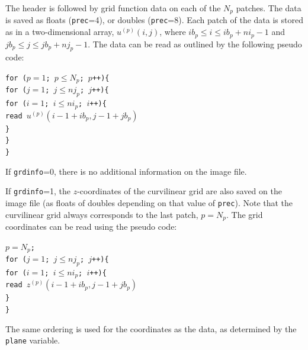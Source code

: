 \documentclass[11pt]{report}
\begin{document}
The header is followed by grid function data on each of the $N_p$ patches. The data is saved as
floats ({\tt prec}=4), or doubles ({\tt prec}=8). Each patch of the data is stored as in a
two-dimensional array, $u^{(p)}(i,j)$, where $ib_p\leq i \leq ib_p+ni_p-1$ and $jb_p\leq j \leq
jb_p+nj_p-1$. The data can be read as outlined by the following pseudo code:
\begin{flushleft}
{\tt for ($p=1$; $p\leq N_p$; $p$++)\{\\
\hspace{5mm}for ($j=1$; $j\leq nj_p$; $j$++)\{\\
\hspace{10mm}for ($i=1$; $i\leq ni_p$; $i$++)\{\\
\hspace{15mm}read $u^{(p)}(i-1+ib_p, j-1+jb_p)$\\
\hspace{10mm}\}\\
\hspace{5mm}\}\\
\}}
\end{flushleft}
If {\tt grdinfo}=0, there is no additional information on the image file.

If {\tt grdinfo}=1, the $z$-coordinates of the curvilinear grid are also saved on the image file
(as floats of doubles depending on that value of {\tt prec}). Note that the curvilinear grid always
corresponds to the last patch, $p=N_p$. The grid coordinates can be read using the pseudo code:
\begin{flushleft}
{\tt $p=N_p$;\\
for ($j=1$; $j\leq nj_p$; $j$++)\{\\
\hspace{5mm}for ($i=1$; $i\leq ni_p$; $i$++)\{\\
\hspace{10mm}read $z^{(p)}(i-1+ib_p, j-1+jb_p)$\\
\hspace{5mm}\}\\
\}}
\end{flushleft}
The same ordering is used for the coordinates as the data, as determined by the {\tt plane} variable.

\end{document}
